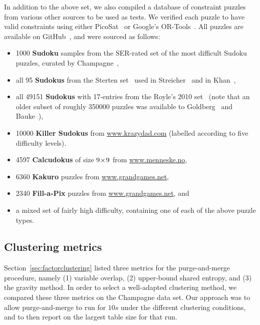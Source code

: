 \documentclass{ieeeaccess}
\begin{document}
{	In addition to the above set, we also compiled a database of constraint puzzles from various other sources to be used as tests. We verified each puzzle to have valid constraints using either PicoSat~\cite{picosat} or Google's OR-Tools~\cite{ortools}. All puzzles are available on GitHub~\cite{streichergithub}, and were sourced as follows:
	\begin{itemize}
		\item
		1000 \textbf{Sudoku} samples from the SER-rated set of the most difficult Sudoku puzzles, curated by Champagne~\cite{champagne},
		
		\item
		all 95 \textbf{Sudokus} from the Sterten set~\cite{sterten} used in Strei\-cher~\cite{streicher} and in Khan~\cite{KhanS},
		
		\item
		all 49151 \textbf{Sudokus} with 17-entries from the Royle's 2010 set~\cite{RoyalG} (note that an older subset of roughly 350000 puzzles was available to Goldberg~\cite{GoldbergerJ} and Bauke~\cite{BaukeH}),
		
		\item
		10000 \textbf{Killer Sudokus} from \url{www.krazydad.com} (labelled according to five difficulty levels).
		
		\item
		4597 \textbf{Calcudokus} of size $9\mkern-3mu \times \mkern-3mu 9$ from \url{www.menneske.no},
		
		\item
		6360 \textbf{Kakuro} puzzles from \url{www.grandgames.net},
		
		\item
		2340 \textbf{Fill-a-Pix} puzzles from \url{www.grandgames.net}, and
		
		\item
		a mixed set of fairly high difficulty, containing one of each of the above puzzle types.
	\end{itemize}
	
	
	\subsection{Clustering metrics}
	Section~\ref{sec:factorclustering} listed three metrics for the purge-and-merge procedure, namely (1) variable overlap, (2) upper-bound shared entropy, and (3) the gravity method. In order to select a well-adapted clustering method, we compared these three metrics on the Champagne data set. Our approach was to allow purge-and-merge to run for $10s$ under the different clustering conditions, and to then report on the largest table size for that run.
	
}
\end{document}
